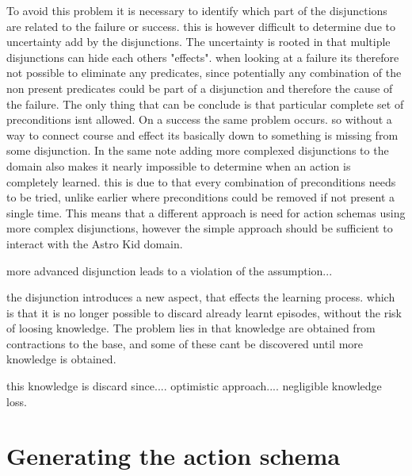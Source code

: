	To avoid this problem it is necessary to identify which part of the disjunctions are related to the failure or success. this is however difficult to determine due to uncertainty add by the disjunctions. The uncertainty is rooted in that multiple disjunctions can hide each others "effects". when looking at a failure its therefore not possible to eliminate any predicates, since potentially any combination of the non present predicates could be part of a disjunction and therefore the cause of the failure. The only thing that can be conclude is that particular complete set of preconditions isnt allowed. On a success the same problem occurs. so without a way to connect course and effect its basically down to something is missing from some disjunction. In the same note adding more complexed disjunctions to the domain also makes it nearly impossible to determine when an action is completely learned. this is due to that every combination of preconditions needs to be tried, unlike earlier where preconditions could be removed if not present a single time. This means that a different approach is need for action schemas using more complex disjunctions, however the simple approach should be sufficient to interact with the Astro Kid domain.
	 
	more advanced disjunction leads to a violation of the assumption...
	

%	
	


	the disjunction introduces a new aspect, that effects the learning process.  which is that it is no longer possible to discard already learnt episodes,  without the risk of loosing knowledge. The problem lies in that knowledge are obtained from contractions to the base, and some of these cant be discovered until more knowledge is obtained. 
	
	this knowledge is discard since.... optimistic approach.... negligible knowledge loss.
	
	
\section{Generating the action schema}	
	
